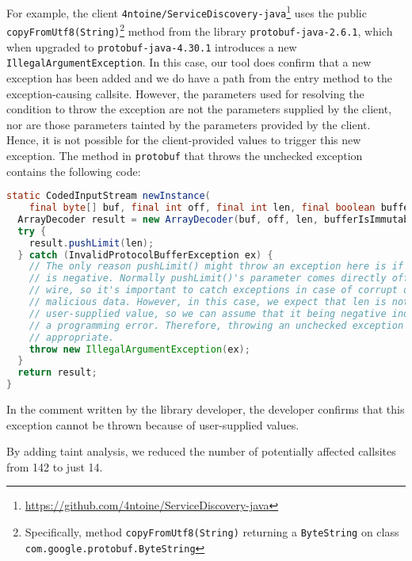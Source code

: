 For example, the client \texttt{4ntoine/ServiceDiscovery-java}\footnote{\url{https://github.com/4ntoine/ServiceDiscovery-java}} uses the public \texttt{copyFromUtf8(String)}\footnote{Specifically, method \texttt{copyFromUtf8(String)} returning a \texttt{ByteString} on class \texttt{com.google.protobuf.ByteString}} method
from the library \texttt{protobuf-java-2.6.1}, which when upgraded to \texttt{protobuf-java-4.30.1} introduces a new \texttt{IllegalArgumentException}. In this case, our tool
does confirm that a new exception has been added and we do have a path from the entry method to the exception-causing callsite. However, the
parameters used for resolving the condition to throw the exception are not the parameters supplied by the client, nor
are those parameters tainted by the parameters provided by the client. Hence, it is not possible for the client-provided values
to trigger this new exception. The method in \texttt{protobuf} that throws the unchecked exception contains the following code:

\begin{lstlisting}[language=Java,breaklines=true,basicstyle=\scriptsize\ttfamily]
static CodedInputStream newInstance(
    final byte[] buf, final int off, final int len, final boolean bufferIsImmutable) {
  ArrayDecoder result = new ArrayDecoder(buf, off, len, bufferIsImmutable);
  try {
    result.pushLimit(len);
  } catch (InvalidProtocolBufferException ex) {
    // The only reason pushLimit() might throw an exception here is if len
    // is negative. Normally pushLimit()'s parameter comes directly off the
    // wire, so it's important to catch exceptions in case of corrupt or
    // malicious data. However, in this case, we expect that len is not a
    // user-supplied value, so we can assume that it being negative indicates
    // a programming error. Therefore, throwing an unchecked exception is
    // appropriate.
    throw new IllegalArgumentException(ex);
  }
  return result;
}
\end{lstlisting}

In the comment written by the library developer, the developer confirms that this exception cannot be thrown because of
user-supplied values.

\vspace{1em}
\begin{tcolorbox}[colback=gray!10, colframe=black]
By adding taint analysis, we reduced the number of potentially affected callsites from 142 to just 14.
\end{tcolorbox}
\vspace{1em}


